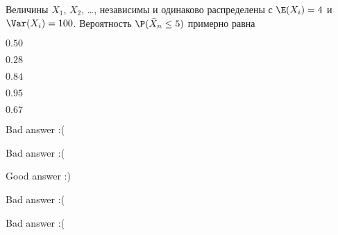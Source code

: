 
\begin{question}
Величины \(X_1\), \(X_2\), \ldots, независимы и одинаково распределены с
\(\E(X_i) = 4\) и \(\Var(X_i) = 100\). Вероятность
\(\P(\bar X_n \leq 5)\) примерно равна
\begin{answerlist}
  \item \(0.50\)
  \item \(0.28\)
  \item \(0.84\)
  \item \(0.95\)
  \item \(0.67\)
\end{answerlist}
\end{question}

\begin{solution}
\begin{answerlist}
  \item Bad answer :(
  \item Bad answer :(
  \item Good answer :)
  \item Bad answer :(
  \item Bad answer :(
\end{answerlist}
\end{solution}

